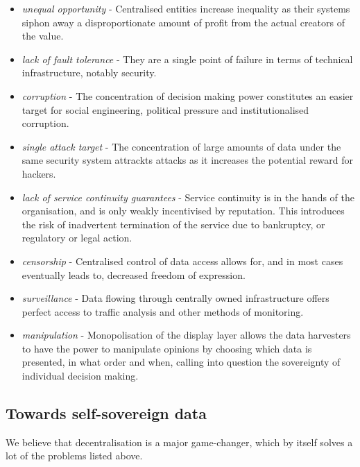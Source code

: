 \begin{itemize}
    \item \emph{unequal opportunity} - Centralised entities increase inequality as their systems siphon away a disproportionate amount of profit from the actual creators of the value.
    \item \emph{lack of fault tolerance} - They are a single point of failure in terms of technical infrastructure, notably security.
    \item \emph{corruption} - The concentration of decision making power constitutes an easier target for social engineering, political pressure and institutionalised corruption.
    \item \emph{single attack target} - The concentration of large amounts of data under the same security system attrackts attacks as it increases the potential reward for hackers. 
    \item \emph{lack of service continuity guarantees} - Service continuity is in the hands of the organisation, and is only weakly incentivised by reputation. This introduces the risk of inadvertent termination of the service due to bankruptcy, or regulatory or legal action.
    \item \emph{censorship} - Centralised control of data access allows for, and in most cases eventually leads to, decreased freedom of expression.
    \item \emph{surveillance} - Data flowing through centrally owned infrastructure offers perfect access to traffic analysis and other methods of monitoring.
    \item \emph{manipulation} - Monopolisation of the display layer allows the data harvesters to have the power to manipulate opinions by choosing which data is presented, in what order and when, calling into question the sovereignty of individual decision making.
\end{itemize}


\subsection{Towards self-sovereign data \statusgreen} \label{sec:selfsovereigndata}

We believe that decentralisation is a major game-changer, which by itself solves a lot of the problems listed above.


